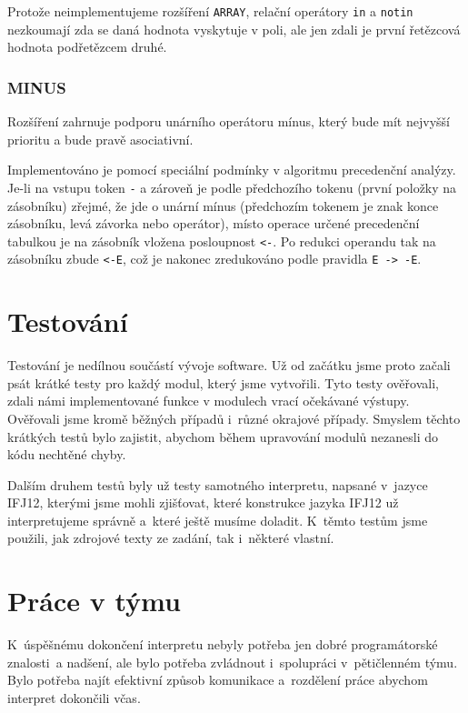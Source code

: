 \documentclass[12pt,a4paper,titlepage,final]{article}
\begin{document}
Protože neimplementujeme rozšíření \texttt{ARRAY}, relační operátory \texttt{in}
a \texttt{notin} nezkoumají zda se daná hodnota vyskytuje v poli, ale jen zdali
je první řetězcová hodnota podřetězcem druhé.

\subsubsection{MINUS}
Rozšíření zahrnuje podporu unárního operátoru mínus, který bude mít nejvyšší
prioritu a bude pravě asociativní.

Implementováno je pomocí speciální podmínky v algoritmu precedenční analýzy.
Je-li na vstupu token \texttt{-} a zároveň je podle předchozího tokenu (první
položky na zásobníku) zřejmé, že jde o unární mínus (předchozím tokenem
je znak konce zásobníku, levá závorka nebo operátor), místo operace určené
precedenční tabulkou je na zásobník vložena posloupnost \texttt{<-}. Po redukci
operandu tak na zásobníku zbude \texttt{<-E}, což je nakonec zredukováno
podle pravidla \texttt{E -> -E}.


\section{Testování} \label{testovani}
Testování je nedílnou součástí vývoje software. Už od začátku jsme proto začali 
psát krátké testy pro každý modul, který jsme vytvořili. Tyto testy ověřovali,
zdali námi implementované funkce v modulech vrací očekávané výstupy. Ověřovali 
jsme kromě běžných případů i~různé okrajové případy. Smyslem těchto krátkých testů 
bylo zajistit, abychom během upravování modulů nezanesli do kódu nechtěné chyby.

Dalším druhem testů byly už testy samotného interpretu, napsané v~jazyce IFJ12, 
kterými jsme mohli zjišťovat, které konstrukce jazyka IFJ12 už interpretujeme 
správně a~které ještě musíme doladit. K~těmto testům jsme použili, jak zdrojové 
texty ze zadání, tak i~některé vlastní.

\section{Práce v týmu} \label{prace_v_tymu}
K~úspěšnému dokončení interpretu nebyly potřeba jen dobré programátorské 
znalosti~a nadšení, ale bylo potřeba zvládnout i~spolupráci v~pětičlenném týmu. 
Bylo potřeba najít efektivní způsob komunikace a~rozdělení práce abychom interpret 
dokončili včas.
\end{document}
